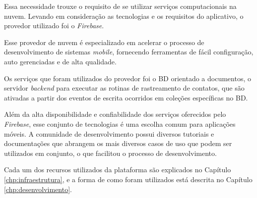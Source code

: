 Essa necessidade trouxe o requisito de se utilizar serviços computacionais na nuvem. Levando em consideração as tecnologias e os requisitos do aplicativo, o provedor utilizado foi o \textit{Firebase}.

Esse provedor de nuvem é especializado em acelerar o processo de desenvolvimento de sistemas \textit{mobile}, fornecendo ferramentas de fácil configuração, auto gerenciadas e de alta qualidade.

Os serviços que foram utilizados do provedor foi o BD orientado a documentos, o servidor \textit{backend} para executar as rotinas de rastreamento de contatos, que são ativadas a partir dos eventos de escrita ocorridos em coleções específicas no BD.

Além da alta disponibilidade e confiabilidade dos serviços oferecidos pelo \textit{Firebase}, esse conjunto de tecnologias é uma escolha comum para aplicações móveis. A comunidade de desenvolvimento possui diversos tutoriais e documentações que abrangem os mais diversos casos de uso que podem ser utilizados em conjunto, o que facilitou o processo de desenvolvimento.

Cada um dos recursos utilizados da plataforma são explicados no Capítulo \ref{chp:infraestrutura}, e a forma de como foram utilizados está descrita no Capítulo \ref{chp:desenvolvimento}.